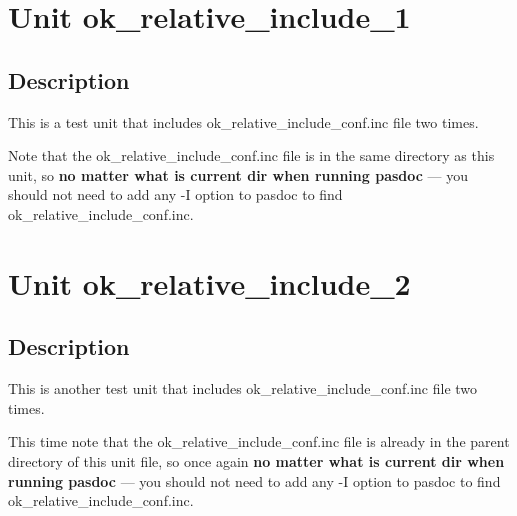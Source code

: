 \documentclass{report}
\begin{document}
\label{toc}\tableofcontents
\newpage
\newlength{\tmplength}
\chapter{Unit ok{\_}relative{\_}include{\_}1}
\label{ok_relative_include_1}
\section{Description}
This is a test unit that includes ok{\_}relative{\_}include{\_}conf.inc file two times.

Note that the ok{\_}relative{\_}include{\_}conf.inc file is in the same directory as this unit, so \textbf{no matter what is current dir when running pasdoc} --- you should not need to add any {-}I option to pasdoc to find ok{\_}relative{\_}include{\_}conf.inc.
\chapter{Unit ok{\_}relative{\_}include{\_}2}
\label{ok_relative_include_2}
\section{Description}
This is another test unit that includes ok{\_}relative{\_}include{\_}conf.inc file two times.

This time note that the ok{\_}relative{\_}include{\_}conf.inc file is already in the parent directory of this unit file, so once again \textbf{no matter what is current dir when running pasdoc} --- you should not need to add any {-}I option to pasdoc to find ok{\_}relative{\_}include{\_}conf.inc.
\end{document}
